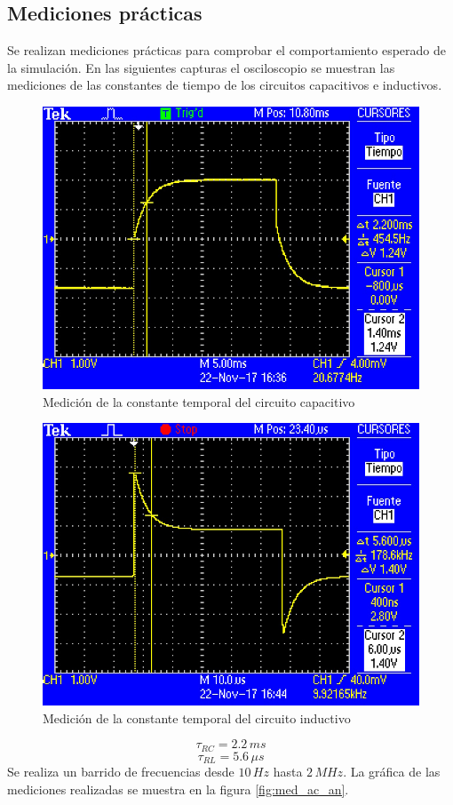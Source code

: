 \documentclass[letterpaper,11pt]{article}
\newcommand{\unidad}[1]{\,\si{#1}}
\begin{document}
	\subsection{Mediciones prácticas}
		Se realizan mediciones prácticas para comprobar el comportamiento esperado de la simulación. En las siguientes capturas el osciloscopio se muestran las mediciones de las constantes de tiempo de los circuitos capacitivos e inductivos.
		\begin{figure}[h!]
			\centering
			\includegraphics[width=0.7\linewidth]{img/TEK0000}
			\caption{Medición de la constante temporal del circuito capacitivo}
			\label{fig:TEK0000}
		\end{figure}
		\begin{figure}[h!]
			\centering
			\includegraphics[width=0.7\linewidth]{img/TEK0003}
			\caption{Medición de la constante temporal del circuito inductivo}
			\label{fig:TEK0001}
		\end{figure}		
		\[ \tau_{RC} = 2.2 \unidad{ms} \]
		\[ \tau_{RL} = 5.6\unidad{\mu s}\]
		\FloatBarrier
		Se realiza un barrido de frecuencias desde $10 \unidad{Hz}$ hasta $2 \unidad{MHz}$. La gráfica de las mediciones realizadas se muestra en la figura \ref{fig:med_ac_an}.
\end{document}
